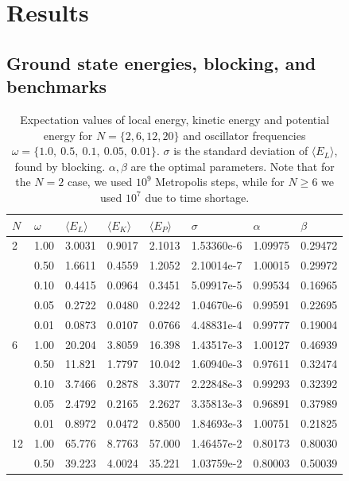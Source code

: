 \documentclass[english, a4paper]{article}
\newcommand\bk[1]{\langle#1\rangle}
\begin{document}
	
	
	
	\section{Results}
	\subsection{Ground state energies, blocking, and benchmarks}
		\begin{table}[H]
			\begin{center}
				\caption{Expectation values of local energy, kinetic energy and potential energy for $N=\{2,6,12,20\}$ and oscillator frequencies $\omega = \{1.0,\:0.5,\:0.1,\:0.05,\:0.01\}$. $\sigma$ is the standard deviation of $\langle E_L\rangle$, found by blocking. $\alpha,\beta$ are the optimal parameters. Note that for the $N=2$ case, we used $10^9$ Metropolis steps, while for $N\geq 6$ we used $10^7$ due to time shortage.}
				\begin{tabularx}{\textwidth}{@{}YYYYYYYY@{}}
					$N$	& $\omega$ & $\bk{E_L}$ & $\bk{E_K}$ & $\bk{E_P}$ & $\sigma$ & $\alpha$ & $\beta$\\
						&	1.00 & 3.0031 & 0.9017 & 2.1013 & 1.53360e-6 & 1.09975 & 0.29472 \\
					&	0.50 & 1.6611 & 0.4559 & 1.2052 & 2.10014e-7 & 1.00015 & 0.29972 \\
					&	0.10 & 0.4415 & 0.0964 & 0.3451 & 5.09917e-5 & 0.99534 & 0.16965 \\
					&	0.05 & 0.2722 & 0.0480 & 0.2242 & 1.04670e-6 & 0.99591 & 0.22695 \\
					&   0.01 & 0.0873 & 0.0107 & 0.0766 & 4.48831e-4 & 0.99777 & 0.19004 \\
					   &	1.00 & 20.204 & 3.8059 & 16.398 & 1.43517e-3 & 1.00127 & 0.46939 \\
					&	0.50 & 11.821 & 1.7797 & 10.042 & 1.60940e-3 & 0.97611 & 0.32474 \\
					&	0.10 & 3.7466 & 0.2878 & 3.3077 & 2.22848e-3 & 0.99293 & 0.32392 \\
					&	0.05 & 2.4792 & 0.2165 & 2.2627 & 3.35813e-3 & 0.96891 & 0.37989 \\
					&   0.01 & 0.8972 & 0.0472 & 0.8500 & 1.84693e-3 & 1.00751 & 0.21825 \\
					  &	1.00 & 65.776 & 8.7763 & 57.000 & 1.46457e-2 & 0.80173 & 0.80030 \\
					&	0.50 & 39.223 & 4.0024 & 35.221 & 1.03759e-2 & 0.80003 & 0.50039 \\

\end{tabularx}
\end{center}
\end{table}
\end{document}
